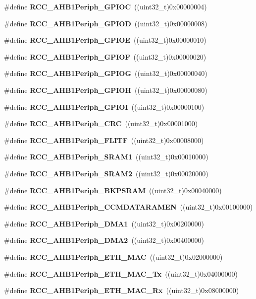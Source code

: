 \begin{DoxyCompactItemize}
\item 
\#define \textbf{ R\+C\+C\+\_\+\+A\+H\+B1\+Periph\+\_\+\+G\+P\+I\+OC}~((uint32\+\_\+t)0x00000004)
\item 
\#define \textbf{ R\+C\+C\+\_\+\+A\+H\+B1\+Periph\+\_\+\+G\+P\+I\+OD}~((uint32\+\_\+t)0x00000008)
\item 
\#define \textbf{ R\+C\+C\+\_\+\+A\+H\+B1\+Periph\+\_\+\+G\+P\+I\+OE}~((uint32\+\_\+t)0x00000010)
\item 
\#define \textbf{ R\+C\+C\+\_\+\+A\+H\+B1\+Periph\+\_\+\+G\+P\+I\+OF}~((uint32\+\_\+t)0x00000020)
\item 
\#define \textbf{ R\+C\+C\+\_\+\+A\+H\+B1\+Periph\+\_\+\+G\+P\+I\+OG}~((uint32\+\_\+t)0x00000040)
\item 
\#define \textbf{ R\+C\+C\+\_\+\+A\+H\+B1\+Periph\+\_\+\+G\+P\+I\+OH}~((uint32\+\_\+t)0x00000080)
\item 
\#define \textbf{ R\+C\+C\+\_\+\+A\+H\+B1\+Periph\+\_\+\+G\+P\+I\+OI}~((uint32\+\_\+t)0x00000100)
\item 
\#define \textbf{ R\+C\+C\+\_\+\+A\+H\+B1\+Periph\+\_\+\+C\+RC}~((uint32\+\_\+t)0x00001000)
\item 
\#define \textbf{ R\+C\+C\+\_\+\+A\+H\+B1\+Periph\+\_\+\+F\+L\+I\+TF}~((uint32\+\_\+t)0x00008000)
\item 
\#define \textbf{ R\+C\+C\+\_\+\+A\+H\+B1\+Periph\+\_\+\+S\+R\+A\+M1}~((uint32\+\_\+t)0x00010000)
\item 
\#define \textbf{ R\+C\+C\+\_\+\+A\+H\+B1\+Periph\+\_\+\+S\+R\+A\+M2}~((uint32\+\_\+t)0x00020000)
\item 
\#define \textbf{ R\+C\+C\+\_\+\+A\+H\+B1\+Periph\+\_\+\+B\+K\+P\+S\+R\+AM}~((uint32\+\_\+t)0x00040000)
\item 
\#define \textbf{ R\+C\+C\+\_\+\+A\+H\+B1\+Periph\+\_\+\+C\+C\+M\+D\+A\+T\+A\+R\+A\+M\+EN}~((uint32\+\_\+t)0x00100000)
\item 
\#define \textbf{ R\+C\+C\+\_\+\+A\+H\+B1\+Periph\+\_\+\+D\+M\+A1}~((uint32\+\_\+t)0x00200000)
\item 
\#define \textbf{ R\+C\+C\+\_\+\+A\+H\+B1\+Periph\+\_\+\+D\+M\+A2}~((uint32\+\_\+t)0x00400000)
\item 
\#define \textbf{ R\+C\+C\+\_\+\+A\+H\+B1\+Periph\+\_\+\+E\+T\+H\+\_\+\+M\+AC}~((uint32\+\_\+t)0x02000000)
\item 
\#define \textbf{ R\+C\+C\+\_\+\+A\+H\+B1\+Periph\+\_\+\+E\+T\+H\+\_\+\+M\+A\+C\+\_\+\+Tx}~((uint32\+\_\+t)0x04000000)
\item 
\#define \textbf{ R\+C\+C\+\_\+\+A\+H\+B1\+Periph\+\_\+\+E\+T\+H\+\_\+\+M\+A\+C\+\_\+\+Rx}~((uint32\+\_\+t)0x08000000)

\end{DoxyCompactItemize}

